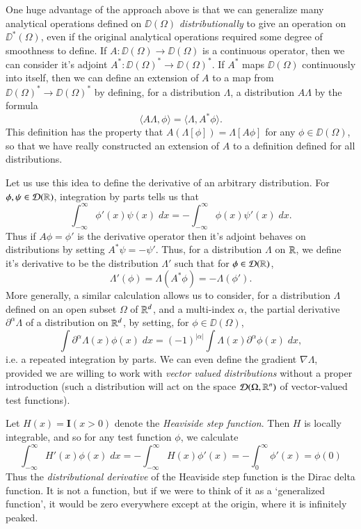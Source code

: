 One huge advantage of the approach above is that we can generalize many analytical operations defined on $\DD(\Omega)$ \emph{distributionally} to give an operation on $\DD^*(\Omega)$, even if the original analytical operations required some degree of smoothness to define. If $A: \DD(\Omega) \to \DD(\Omega)$ is a continuous operator, then we can consider it's adjoint $A^*: \DD(\Omega)^* \to \DD(\Omega)^*$. If $A^*$ maps $\DD(\Omega)$ continuously into itself, then we can define an extension of $A$ to a map from $\DD(\Omega)^* \to \DD(\Omega)^*$ by defining, for a distribution $\Lambda$, a distribution $A \Lambda$ by the formula
%
\[ \langle A \Lambda, \phi \rangle = \langle \Lambda, A^* \phi \rangle. \]
%
This definition has the property that $A(\Lambda[\phi]) = \Lambda[A \phi ]$ for any $\phi \in \DD(\Omega)$, so that we have really constructed an extension of $A$ to a definition defined for all distributions.

Let us use this idea to define the derivative of an arbitrary distribution. For $\phi,\psi \in \operatorname{\mathcal{D}}(\operatorname{\mathbb{R}})$, integration by parts tells us that
%
\[ \int_{-\infty}^\infty \phi'(x) \psi(x)\; dx = - \int_{-\infty}^\infty \phi(x) \psi'(x)\; dx. \]
%
Thus if $A\phi = \phi'$ is the derivative operator then it's adjoint behaves on distributions by setting $A^* \psi = - \psi'$. Thus, for a distribution $\Lambda$ on $\operatorname{\mathbb{R}}$, we define it's derivative to be the distribution $\Lambda'$ such that for $\phi \in \operatorname{\mathcal{D}}(\operatorname{\mathbb{R}})$,
%
\[ \Lambda'(\phi) = \Lambda(A^* \phi) = - \Lambda(\phi'). \]
%
More generally, a similar calculation allows us to consider, for a distribution $\Lambda$ defined on an open subset $\Omega$ of $\operatorname{\mathbb{R}}^d$, and a multi-index $\alpha$, the partial derivative $\partial^\alpha \Lambda$ of a distribution on $\operatorname{\mathbb{R}}^d$, by setting, for $\phi \in \DD(\Omega)$,
%
\[ \int \partial^\alpha \Lambda(x) \phi(x)\; dx = (-1)^{|\alpha|} \int \Lambda(x) \partial^\alpha \phi(x)\; dx, \]
%
i.e. a repeated integration by parts. We can even define the gradient $\nabla \Lambda$, provided we are willing to work with \emph{vector valued distributions} without a proper introduction (such a distribution will act on the space $\operatorname{\mathcal{D}}(\Omega, \operatorname{\mathbb{R}}^n)$ of vector-valued test functions).

\begin{example}
    Let $H(x) = \mathbf{I}(x > 0)$ denote the {\it Heaviside step function}. Then $H$ is locally integrable, and so for any test function $\phi$, we calculate
    \[ \int_{-\infty}^\infty H'(x) \phi(x)\; dx = - \int_{-\infty}^\infty H(x) \phi'(x) = - \int_0^\infty \phi'(x) = \phi(0) \]
    Thus the \emph{distributional derivative} of the Heaviside step function is the Dirac delta function. It is not a function, but if we were to think of it as a `generalized function', it would be zero everywhere except at the origin, where it is infinitely peaked.
\end{example}

